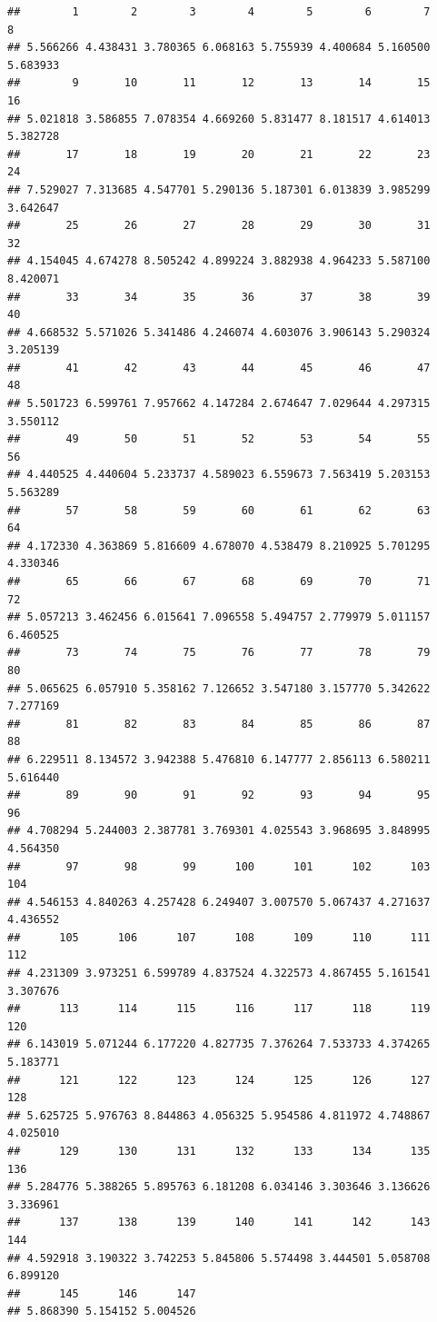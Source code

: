 \documentclass[
]{book}
\begin{document}
\begin{verbatim}
##        1        2        3        4        5        6        7        8 
## 5.566266 4.438431 3.780365 6.068163 5.755939 4.400684 5.160500 5.683933 
##        9       10       11       12       13       14       15       16 
## 5.021818 3.586855 7.078354 4.669260 5.831477 8.181517 4.614013 5.382728 
##       17       18       19       20       21       22       23       24 
## 7.529027 7.313685 4.547701 5.290136 5.187301 6.013839 3.985299 3.642647 
##       25       26       27       28       29       30       31       32 
## 4.154045 4.674278 8.505242 4.899224 3.882938 4.964233 5.587100 8.420071 
##       33       34       35       36       37       38       39       40 
## 4.668532 5.571026 5.341486 4.246074 4.603076 3.906143 5.290324 3.205139 
##       41       42       43       44       45       46       47       48 
## 5.501723 6.599761 7.957662 4.147284 2.674647 7.029644 4.297315 3.550112 
##       49       50       51       52       53       54       55       56 
## 4.440525 4.440604 5.233737 4.589023 6.559673 7.563419 5.203153 5.563289 
##       57       58       59       60       61       62       63       64 
## 4.172330 4.363869 5.816609 4.678070 4.538479 8.210925 5.701295 4.330346 
##       65       66       67       68       69       70       71       72 
## 5.057213 3.462456 6.015641 7.096558 5.494757 2.779979 5.011157 6.460525 
##       73       74       75       76       77       78       79       80 
## 5.065625 6.057910 5.358162 7.126652 3.547180 3.157770 5.342622 7.277169 
##       81       82       83       84       85       86       87       88 
## 6.229511 8.134572 3.942388 5.476810 6.147777 2.856113 6.580211 5.616440 
##       89       90       91       92       93       94       95       96 
## 4.708294 5.244003 2.387781 3.769301 4.025543 3.968695 3.848995 4.564350 
##       97       98       99      100      101      102      103      104 
## 4.546153 4.840263 4.257428 6.249407 3.007570 5.067437 4.271637 4.436552 
##      105      106      107      108      109      110      111      112 
## 4.231309 3.973251 6.599789 4.837524 4.322573 4.867455 5.161541 3.307676 
##      113      114      115      116      117      118      119      120 
## 6.143019 5.071244 6.177220 4.827735 7.376264 7.533733 4.374265 5.183771 
##      121      122      123      124      125      126      127      128 
## 5.625725 5.976763 8.844863 4.056325 5.954586 4.811972 4.748867 4.025010 
##      129      130      131      132      133      134      135      136 
## 5.284776 5.388265 5.895763 6.181208 6.034146 3.303646 3.136626 3.336961 
##      137      138      139      140      141      142      143      144 
## 4.592918 3.190322 3.742253 5.845806 5.574498 3.444501 5.058708 6.899120 
##      145      146      147 
## 5.868390 5.154152 5.004526
\end{verbatim}
\end{document}
